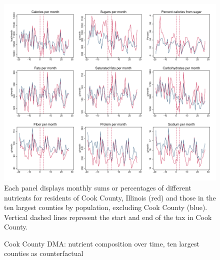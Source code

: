 \documentclass[12pt]{article}
\begin{document}
\clearpage
\begin{figure}[t]
\begin{center}
\caption{Cook County DMA: nutrient composition over time, ten largest counties as counterfactual}
\label{cook_panelist_nutr_counties_largest}
\includegraphics[width=1\textwidth, angle=0]{../figures/panelist_nutr_counties_largest.pdf}
\footnotesize Each panel displays monthly sums or percentages of different nutrients for residents of Cook County, Illinois (red) and those in the ten largest counties by population, excluding Cook County (blue). Vertical dashed lines represent the start and end of the tax in Cook County.
\end{center}
\end{figure}
\end{document}
